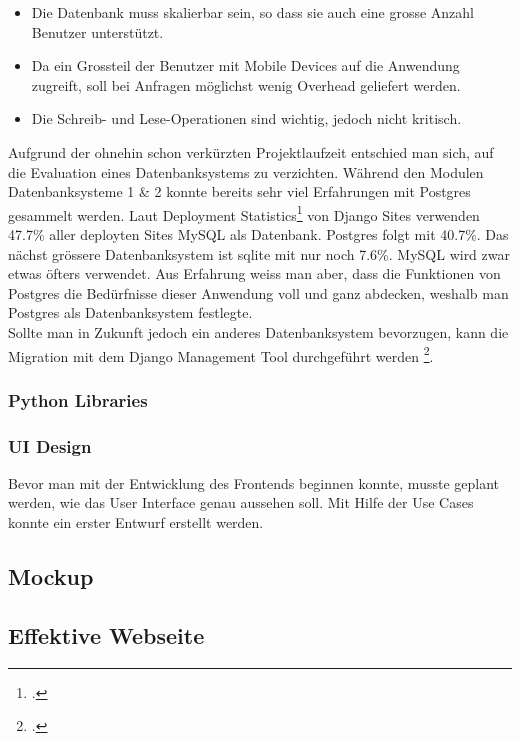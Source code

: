\begin{itemize}
	\item Die Datenbank muss skalierbar sein, so dass sie auch eine grosse Anzahl Benutzer unterstützt.
	\item Da ein Grossteil der Benutzer mit Mobile Devices auf die Anwendung zugreift, soll bei Anfragen möglichst wenig Overhead geliefert werden.
	\item Die Schreib- und Lese-Operationen sind wichtig, jedoch nicht kritisch. 
\end{itemize}

Aufgrund der ohnehin schon verkürzten Projektlaufzeit entschied man sich, auf die Evaluation eines Datenbanksystems zu verzichten. Während den Modulen Datenbanksysteme 1 \& 2 konnte bereits sehr viel Erfahrungen mit Postgres gesammelt werden. Laut Deployment Statistics\footcite{deploymentstatistics} von Django Sites verwenden 47.7\% aller deployten Sites MySQL als Datenbank. Postgres folgt mit 40.7\%. Das nächst grössere Datenbanksystem ist sqlite mit nur noch 7.6\%.
MySQL wird zwar etwas öfters verwendet. Aus Erfahrung weiss man aber, dass die Funktionen von Postgres die Bedürfnisse dieser Anwendung voll und ganz abdecken, weshalb man Postgres als Datenbanksystem festlegte. \\

Sollte man in Zukunft jedoch ein anderes Datenbanksystem bevorzugen, kann die Migration mit dem Django Management Tool durchgeführt werden \footcite{dbmigration}. 

\subsubsection*{Python Libraries}

\subsubsection{UI Design}
Bevor man mit der Entwicklung des Frontends beginnen konnte, musste geplant werden, wie das User Interface genau aussehen soll. Mit Hilfe der Use Cases konnte ein erster Entwurf erstellt werden. 

\subsection{Mockup}

\newpage



\subsection{Effektive Webseite}

\newpage